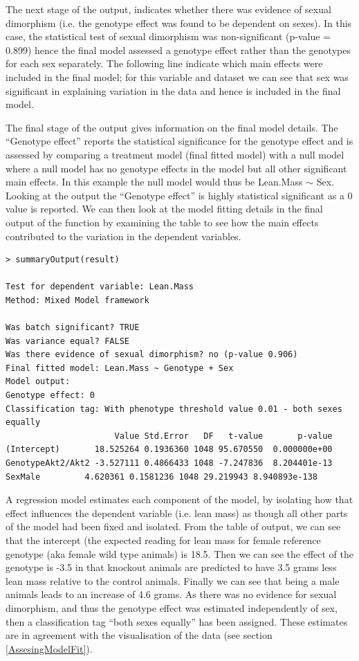 \documentclass[12pt,a4paper]{article}
\begin{document}
The next stage of the output, indicates whether there was evidence of sexual dimorphism (i.e. the genotype effect was found to be dependent on sexes).  
In this case, the statistical test of sexual dimorphism was non-significant (p-value = 0.899) hence the final model assessed a genotype effect rather than the genotypes for each sex separately.  
The following line indicate which main effects were included in the final model; 
for this variable and dataset we can see that sex was significant in explaining variation in the data and hence is included in the final model. 

The final stage of the output gives information on the final model details.  
The “Genotype effect” reports the statistical significance for the genotype effect and is assessed by comparing a treatment model (final fitted model) with a null model where a null model 
has no genotype effects in the model but all other significant main effects.  
In this example the null model would thus be Lean.Mass $\sim$ Sex. Looking at the output the “Genotype effect” is highly statistical significant as a 0 value is reported.  
We can then look at the model fitting details in the final output of the function by examining the table to see how the main effects contributed to the variation in the dependent variables. 

\begingroup
    \fontsize{8pt}{12pt}\selectfont
\begin{verbatim}
> summaryOutput(result)

Test for dependent variable: Lean.Mass
Method: Mixed Model framework

Was batch significant? TRUE
Was variance equal? FALSE
Was there evidence of sexual dimorphism? no (p-value 0.906)
Final fitted model: Lean.Mass ~ Genotype + Sex
Model output:
Genotype effect: 0
Classification tag: With phenotype threshold value 0.01 - both sexes equally
                      Value Std.Error   DF   t-value       p-value
(Intercept)       18.525264 0.1936360 1048 95.670550  0.000000e+00
GenotypeAkt2/Akt2 -3.527111 0.4866433 1048 -7.247836  8.204401e-13
SexMale         4.620361 0.1581236 1048 29.219943 8.940893e-138

\end{verbatim}
\endgroup 

A regression model estimates each component of the model, by isolating how that effect influences the dependent variable (i.e. lean mass) as though all other parts of the model had been fixed and isolated.   
From the table of output, we can see that the intercept (the expected reading for lean mass for female reference genotype (aka female wild type animals) is 18.5.  
Then we can see the effect of the genotype is -3.5 in that knockout animals are predicted to have 3.5 grams less lean mass relative to the control animals.  
Finally we can see that being a male animals leads to an increase of 4.6 grams.  
As there was no evidence for sexual dimorphism, and thus the genotype effect was estimated independently of sex, then a classification tag “both sexes equally” has been assigned.  
These estimates are in agreement with the visualisation of the data (see section \ref{AssesingModelFit}). 
\end{document}
